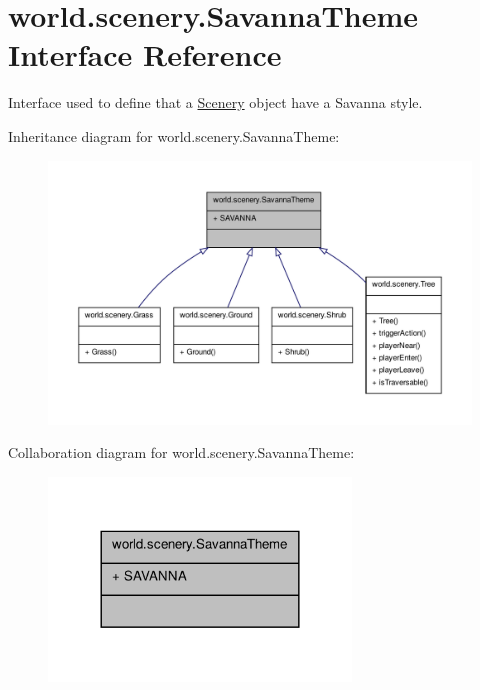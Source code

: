 \hypertarget{interfaceworld_1_1scenery_1_1_savanna_theme}{\section{world.\-scenery.\-Savanna\-Theme Interface Reference}
\label{interfaceworld_1_1scenery_1_1_savanna_theme}
}


Interface used to define that a \hyperlink{classworld_1_1scenery_1_1_scenery}{Scenery} object have a Savanna style.  




Inheritance diagram for world.\-scenery.\-Savanna\-Theme\-:\nopagebreak
\begin{figure}[H]
\begin{center}
\leavevmode
\includegraphics[width=350pt]{interfaceworld_1_1scenery_1_1_savanna_theme__inherit__graph}
\end{center}
\end{figure}


Collaboration diagram for world.\-scenery.\-Savanna\-Theme\-:\nopagebreak
\begin{figure}[H]
\begin{center}
\leavevmode
\includegraphics[width=228pt]{interfaceworld_1_1scenery_1_1_savanna_theme__coll__graph}
\end{center}
\end{figure}
